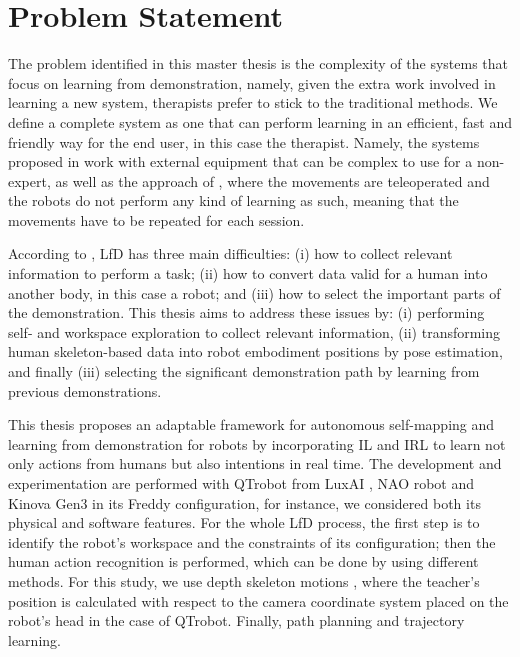 \documentclass[thesis]{mas_proposal}
\begin{document}
\section{Problem Statement}
    
    The problem identified in this master thesis is the complexity of the systems that focus on learning from demonstration, namely, given the extra work involved in learning a new system, therapists prefer to stick to the traditional methods. We define a complete system as one that can perform learning in an efficient, fast and friendly way for the end user, in this case the therapist. Namely, the systems proposed in \cite{Hua2021, Koenemann2012} work with external equipment that can be complex to use for a non-expert, as well as the approach of \cite{Si2021, Assad2020, Kulikovskiy2021}, where the movements are teleoperated and the robots do not perform any kind of learning as such, meaning that the movements have to be repeated for each session.
    
    According to \cite{Lopes2005}, LfD has three main difficulties: (i) how to collect relevant information to perform a task; (ii) how to convert data valid for a human into another body, in this case a robot; and (iii) how to select the important parts of the demonstration. This thesis aims to address these issues by: (i) performing self- and workspace exploration to collect relevant information, (ii) transforming human skeleton-based data into robot embodiment positions by pose estimation, and finally (iii) selecting the significant demonstration path by learning from previous demonstrations.
    
    This thesis proposes an adaptable framework for autonomous self-mapping and learning from demonstration for robots by incorporating IL and IRL to learn not only actions from humans but also intentions in real time. The development and experimentation are performed with QTrobot from LuxAI \cite{qtrobot_safety_manual}, NAO robot and Kinova Gen3 in its Freddy configuration, for instance, we considered both its physical and software features. For the whole LfD process, the first step is to identify the robot's workspace and the constraints of its configuration; then the human action recognition is performed, which can be done by using different methods. For this study, we use depth skeleton motions \cite{Chen2016}, where the teacher's position is calculated with respect to the camera coordinate system placed on the robot's head in the case of QTrobot. Finally, path planning and trajectory learning.
 
\end{document}
